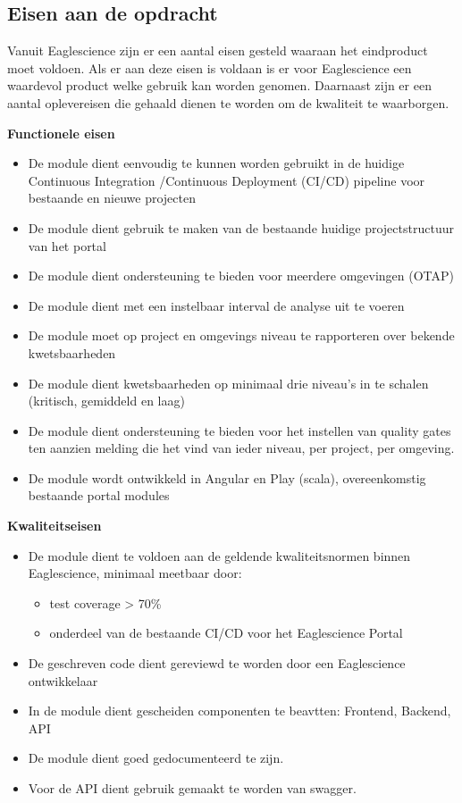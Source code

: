 \subsection{Eisen aan de opdracht}\label{subsec: eisen-aan-de-opdracht}

Vanuit Eaglescience zijn er een aantal eisen gesteld waaraan het eindproduct moet voldoen.
Als er aan deze eisen is voldaan is er voor Eaglescience een waardevol product welke gebruik kan worden genomen.
Daarnaast zijn er een aantal oplevereisen die gehaald dienen te worden om de kwaliteit te waarborgen.

\textbf{Functionele eisen}
\begin{itemize}
\item De module dient eenvoudig te kunnen worden gebruikt in de huidige Continuous Integration /Continuous Deployment (CI/CD) pipeline voor bestaande en nieuwe projecten
\item De module dient gebruik te maken van de bestaande huidige projectstructuur van het portal
\item De module dient ondersteuning te bieden voor meerdere omgevingen (OTAP)
\item De module dient met een instelbaar interval de analyse uit te voeren
\item De module moet op project en omgevings niveau te rapporteren over bekende kwetsbaarheden
\item De module dient kwetsbaarheden op minimaal drie niveau’s in te schalen (kritisch, gemiddeld en laag)
\item De module dient ondersteuning te bieden voor het instellen van quality gates ten aanzien melding die het vind van ieder niveau, per project, per omgeving.
\item De module wordt ontwikkeld in Angular en Play (scala), overeenkomstig bestaande portal modules
\end{itemize}
\textbf{Kwaliteitseisen}
\begin{itemize}
\item De module dient te voldoen aan de geldende kwaliteitsnormen binnen Eaglescience, minimaal meetbaar door:
	\begin{itemize}
	\item test coverage > 70\%
	\item onderdeel van de bestaande CI/CD voor het Eaglescience Portal
	\end{itemize}
\item De geschreven code dient gereviewd te worden door een Eaglescience ontwikkelaar
\item In de module dient gescheiden componenten te beavtten: Frontend, Backend, API
\item De module dient goed gedocumenteerd te zijn.
\item Voor de API dient gebruik gemaakt te worden van swagger.
\end{itemize}


